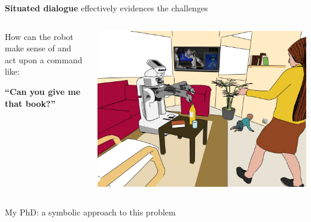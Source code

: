 \documentclass[xcolor=table]{beamer}
\begin{document}
\begin{frame}[plain]

    \centering
    {\bf Situated dialogue} effectively evidences the challenges

    \begin{columns}
        \begin{column}{0.5\linewidth}
            How can the robot make sense of and act upon a command like:
            \vspace{2em}

            \bf
            ``Can you give me that book?''
        \end{column}
        \begin{column}{0.5\linewidth}
            \begin{center}
                \includegraphics[width=\linewidth]{pr2-baby-3}
            \end{center}
        \end{column}
    \end{columns}

    \pause

    \vspace{2em}
    My PhD: a symbolic approach to this problem
\end{frame}


\end{document}

